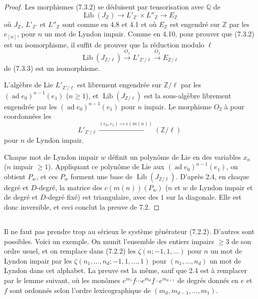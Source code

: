\documentclass[11pt,a4paper]{article}
\theoremstyle{plain}
\theoremstyle{definition}
\DeclareMathOperator{\Lib}{Lib}
\DeclareMathOperator{\ad}{ad}
\newcommand{\Q}{\mathbb{Q}}
\newcommand{\Z}{\mathbb{Z}}
\begin{document}
\begin{proof}
Les morphismes (7.3.2) se d\'eduisent par tensorisation avec $\Q$ de
\begin{equation}\label{eq:7.3.3}
\Lib(J_\Z) \to L'_{\Z'} \times L''_\Z \to E_\Z
\end{equation}
o\`u $J_\Z$, $L'_{\Z'}$ et $L''_\Z$ sont comme en 4.8 et 4.1 et o\`u $E_\Z$ est engendr\'e sur $\Z$ par les $e_{[n]}$, pour $n$ un mot de Lyndon impair. Comme en 4.10, pour prouver que (7.3.2) est un isomorphisme, il suffit de prouver que la r\'eduction modulo $\ell$
\begin{equation}\label{eq:7.3.4}
\Lib(J_{\Z/\ell}) \xrightarrow{O_1} L'_{\Z'/\ell} \xrightarrow{O_2} E_{\Z/\ell}
\end{equation}
de (7.3.3) est un isomorphisme.

L'alg\`ebre de Lie $L'_{\Z'/\ell}$ est librement engendr\'ee sur $\Z/\ell$ par les $(\ad e_0)^{n-1}(e_1)$ ($n \geq 1$), et $\Lib(J_{\Z/\ell})$ est la sous-alg\`ebre librement engendr\'ee par les $(\ad e_0)^{n-1}(e_1)$ pour $n$ impair. Le morphisme $O_2$ \`a pour coordonn\'ees les
\[
L'_{\Z'/\ell} \xrightarrow{(e_0, e_1) \mapsto c(m(n))} (\Z/\ell)
\]
pour $n$ de Lyndon impair.

Chaque mot de Lyndon impair $w$ d\'efinit un polyn\^ome de Lie en des variables $x_n$ ($n$ impair $\geq 1$). Appliquant ce polyn\^ome de Lie aux $(\ad e_0)^{n-1}(e_1)$, on obtient $P_w$, et ces $P_w$ forment une base de $\Lib(J_{\Z/\ell})$. D'apr\`es 2.4, en chaque degr\'e et $D$-degr\'e, la matrice des $c(m(n))(P_w)$ ($n$ et $w$ de Lyndon impair et de degr\'e et $D$-degr\'e fix\'e) est triangulaire, avec des $1$ sur la diagonale. Elle est donc inversible, et ceci conclut la preuve de 7.2.
\end{proof}

\subsection{}
Il ne faut pas prendre trop au s\'erieux le syst\`eme g\'en\'erateur (7.2.2). D'autres sont possibles. Voici un exemple. On munit l'ensemble des entiers impairs $\geq 3$ de son ordre usuel, et on remplace dans (7.2.2) les $\zeta(n; -1, 1, \ldots)$ pour $n$ un mot de Lyndon impair par les $\zeta(n_1,\ldots,n_d; -1, 1, \ldots, 1)$ pour $(n_1,\ldots,n_d)$ un mot de Lyndon dans cet alphabet. La preuve est la m\^eme, sauf que 2.4 est \`a remplacer par le lemme suivant, o\`u les mon\^omes $e^{m_1}f \cdots e^{m_d}f \cdot e^{m_{d+1}}$ de degr\'es donn\'es en $e$ et $f$ sont ordonn\'es selon l'ordre lexicographique de $(m_d, m_{d-1},\ldots, m_1)$.
\end{document}
